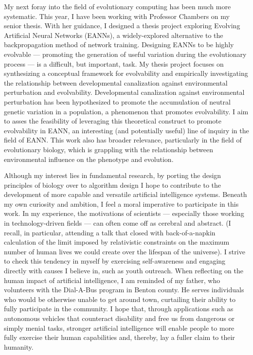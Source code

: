 \documentclass[12pt]{book}
\begin{document}
My next foray into the field of evolutionary computing has been much more systematic.
This year, I have been working with Professor Chambers on my senior thesis.
With her guidance, I designed a thesis project exploring Evolving Artificial Neural Networks (EANNs), a widely-explored alternative to the backpropagation method of network training.
Designing EANNs to be highly evolvable  ---  promoting the generation of useful variation during the evolutionary process  ---  is a difficult, but important, task.
My thesis project focuses on synthesizing a conceptual framework for evolvability and empirically investigating the relationship between developmental canalization against environmental perturbation and evolvability.
Developmental canalization against environmental perturbation has been hypothesized to promote the accumulation of neutral genetic variation in a population, a phenomenon that promotes evolvability.
I aim to asses the feasibility of leveraging this theoretical construct to promote evolvability in EANN, an interesting (and potentially useful) line of inquiry in the field of EANN.
This work also has broader relevance, particularly in the field of evolutionary biology, which is grappling with the relationship between environmental influence on the phenotype and evolution.


Although my interest lies in fundamental research, by porting the design principles of biology over to algorithm design I hope to contribute to the development of more capable and versatile artificial intelligence systems.
Beneath my own curiosity and ambition, I feel a moral imperative to participate in this work.
In my experience, the motivations of scientists --- especially those working in technology-driven fields --- can often come off as cerebral and abstract.
(I recall, in particular, attending a talk that closed with back-of-a-napkin calculation of the limit imposed by relativistic constraints on the maximum number of human lives we could create over the lifespan of the universe).
I strive to check this tendency in myself by exercising self-awareness and engaging directly with causes I believe in, such as youth outreach.
When reflecting on the human impact of artificial intelligence, I am reminded of my father, who volunteers with the Dial-A-Bus program in Benton county.
He serves individuals who would be otherwise unable to get around town, curtailing their ability to fully participate in the community.
I hope that, through applications such as autonomous vehicles that counteract disability and free us from dangerous or simply menial tasks, stronger artificial intelligence will enable people to more fully exercise their human capabilities and, thereby, lay a fuller claim to their humanity.
\end{document}
